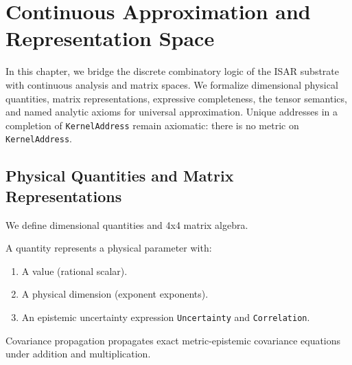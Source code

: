 \chapter{Continuous Approximation and Representation Space}

In this chapter, we bridge the discrete combinatory logic of the ISAR substrate with continuous analysis and matrix spaces. We formalize dimensional physical quantities, matrix representations, expressive completeness, the tensor semantics, and named analytic axioms for universal approximation. Unique addresses in a completion of \texttt{KernelAddress} remain axiomatic: there is no metric on \texttt{KernelAddress}.

\section{Physical Quantities and Matrix Representations}

We define dimensional quantities and 4x4 matrix algebra.

\begin{definition}
A quantity represents a physical parameter with:
\begin{enumerate}
    \item A value (rational scalar).
    \item A physical dimension (exponent exponents).
    \item An epistemic uncertainty expression \texttt{Uncertainty} and \texttt{Correlation}.
\end{enumerate}
Covariance propagation propagates exact metric-epistemic covariance equations under addition and multiplication.
\end{definition}

